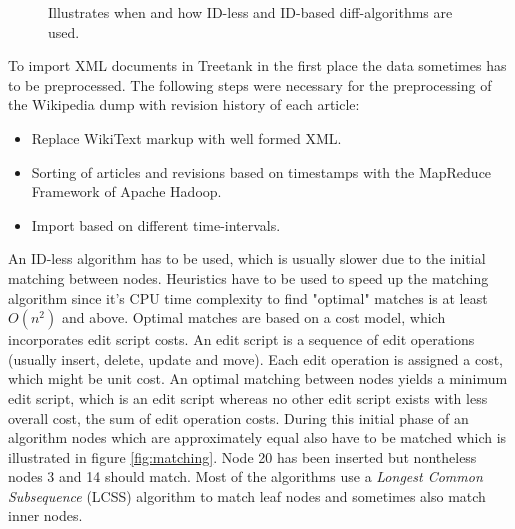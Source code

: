 \documentclass{llncs}
\begin{document}
\begin{figure}[htb]
\caption{\label{fig:importdata} Illustrates when and how ID-less and ID-based diff-algorithms are used.}
\end{figure}

To import XML documents in Treetank in the first place the data sometimes has to be preprocessed. The following steps were necessary for the preprocessing of the Wikipedia dump with revision history of each article:

\begin{itemize}
\item Replace WikiText markup with well formed XML.
\item Sorting of articles and revisions based on timestamps with the MapReduce Framework of Apache Hadoop\cite{hadoop}.
\item Import based on different time-intervals.
\end{itemize}

An ID-less algorithm has to be used, which is usually slower due to the initial matching between nodes. Heuristics have to be used to speed up the matching algorithm since it's CPU time complexity to find "optimal" matches is at least $O(n^2)$ and above. Optimal matches are based on a cost model, which incorporates edit script costs. An edit script is a sequence of edit operations (usually insert, delete, update and move). Each edit operation is assigned a cost, which might be unit cost. An optimal matching between nodes yields a minimum edit script, which is an edit script whereas no other edit script exists with less overall cost, the sum of edit operation costs. During this initial phase of an algorithm nodes which are approximately equal also have to be matched which is illustrated in figure \ref{fig:matching}. Node 20 has been inserted but nontheless nodes 3 and 14 should match. Most of the algorithms use a \emph{Longest Common Subsequence} (LCSS) algorithm to match leaf nodes and sometimes also match inner nodes.
\end{document}
